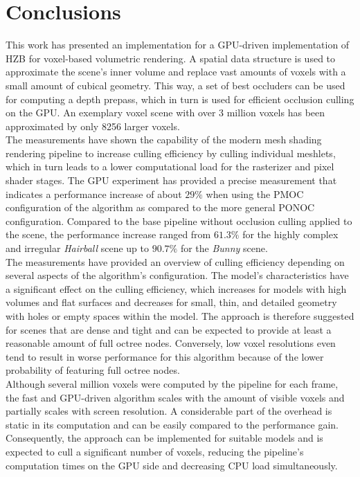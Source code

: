 \chapter{Conclusions} \label{cpt-conclusion}

This work has presented an implementation for a \ac{GPU}-driven implementation of 
\ac{HZB} for voxel-based volumetric rendering. A spatial data structure is 
used to approximate the scene's inner volume and replace vast amounts of voxels 
with a small amount of cubical geometry. This way, a set of best occluders can 
be used for computing a depth prepass, which in turn is used for efficient 
occlusion culling on the \ac{GPU}. An exemplary voxel scene with over 3 million 
voxels has been approximated by only 8256 larger voxels.  \\

\noindent
The measurements have shown the capability of the modern mesh shading rendering 
pipeline to increase culling efficiency by culling individual meshlets, which in 
turn leads to a lower computational load for the rasterizer and pixel shader 
stages. The \ac{GPU} experiment has provided a precise measurement that indicates a 
performance increase of about $29 \%$ when using the \ac{PMOC} configuration 
of the algorithm as compared to the more general \ac{PONOC} configuration. 
Compared to the base pipeline without occlusion culling applied to the scene, the 
performance increase ranged from $61.3 \%$ for the highly complex and irregular 
\emph{Hairball} scene up to $90.7 \%$ for the \emph{Bunny} scene. \\

\noindent
The measurements have provided an overview of culling efficiency depending on several aspects 
of the algorithm's configuration. The model's characteristics have a significant 
effect on the culling efficiency, which increases for models with high volumes and flat 
surfaces and decreases for small, thin, and detailed geometry with holes or empty spaces 
within the model. The approach is therefore suggested for scenes that are dense and tight 
and can be expected to provide at least a reasonable amount of full octree nodes. Conversely, 
low voxel resolutions even tend to result in worse performance for this algorithm because of 
the lower probability of featuring full octree nodes. \\

\noindent
Although several million voxels were computed by the pipeline for each frame, the fast and 
\ac{GPU}-driven algorithm scales with the amount of visible voxels and partially scales 
with screen resolution. A considerable part of the overhead is static in its computation 
and can be easily compared to the performance gain. Consequently, the approach can be 
implemented for suitable models and is expected to cull a significant number of voxels, 
reducing the pipeline's computation times on the \ac{GPU} side and decreasing \ac{CPU} 
load simultaneously. \\

